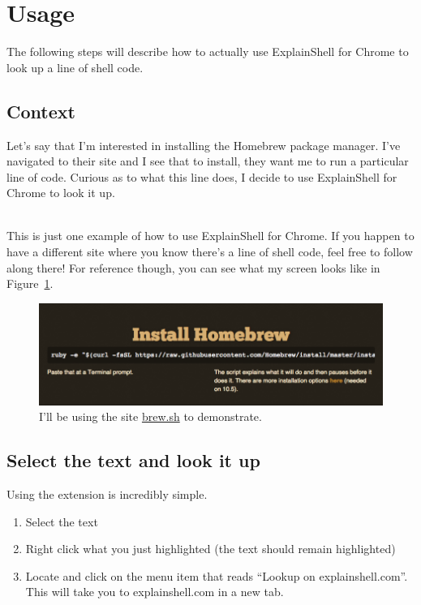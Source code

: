 \documentclass[11pt]{article}
\begin{document}
\section{Usage}
The following steps will describe how to actually use ExplainShell for Chrome to look up a line of shell code.

\subsection{Context}
Let's say that I'm interested in installing the Homebrew package manager. I've navigated to their site and I see that to install, they want me to run a particular line of code. Curious as to what this line does, I decide to use ExplainShell for Chrome to look it up.

\mbox{} \\
\noindent
This is just one example of how to use ExplainShell for Chrome. If you happen to have a different site where you know there's a line of shell code, feel free to follow along there! For reference though, you can see what my screen looks like in Figure~\ref{brew}.

\begin{figure}[H]
  \begin{center}
    \includegraphics[width=\textwidth, height=\textheight, keepaspectratio]{05brew}
  \end{center}
  \caption{I'll be using the site \url{brew.sh} to demonstrate.}
  \label{brew}
\end{figure}

\subsection{Select the text and look it up}
Using the extension is incredibly simple. 

\begin{enumerate}
  \item Select the text
  \item Right click what you just highlighted (the text should remain highlighted)
  \item Locate and click on the menu item that reads ``Lookup on explainshell.com''. This will take you to explainshell.com in a new tab.
\end{enumerate}
\end{document}
